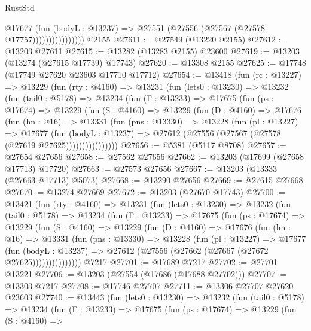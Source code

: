 \begin{lexlean}{RustStd}
\begin{coremodule}
                          @17677
                            (fun (bodyL : @13237) =>
                            @27551 (@27556 (@27567 (@27578 @17757))))))))))))))))
    @2155
@27611 := @27549 (@13220 @2155)
@27612 := @13203 @27611
@27615 := @13282 (@13283 @2155) @23600
@27619 := @13203 (@13274 (@27615 @17739) @17743)
@27620 := @13308 @2155
@27625 := @17748 (@17749 @27620 @23603 @17710 @17712)
@27654 := @13418
    (fun (rc : @13227) =>
    @13229
      (fun (rty : @4160) =>
      @13231
        (fun (lets0 : @13230) =>
        @13232
          (fun (tail0 : @5178) =>
          @13234
            (fun (Γ : @13233) =>
            @17675
              (fun (ps : @17674) =>
              @13229
                (fun (S : @4160) =>
                @13229
                  (fun (D : @4160) =>
                  @17676
                    (fun (hn : @16) =>
                    @13331
                      (fun (pns : @13330) =>
                      @13228
                        (fun (pl : @13227) =>
                        @17677
                          (fun (bodyL : @13237) =>
                          @27612 (@27556 (@27567 (@27578 (@27619 @27625))))))))))))))))
@27656 := @5381 (@5117 @8708)
@27657 := @27654 @27656
@27658 := @27562 @27656
@27662 := @13203 (@17699 (@27658 @17713) @17720)
@27663 := @27573 @27656
@27667 := @13203 (@13333 (@27663 @17713) @5073)
@27668 := @13290 @27656
@27669 := @27615 @27668
@27670 := @13274 @27669
@27672 := @13203 (@27670 @17743)
@27700 := @13421
    (fun (rty : @4160) =>
    @13231
      (fun (lets0 : @13230) =>
      @13232
        (fun (tail0 : @5178) =>
        @13234
          (fun (Γ : @13233) =>
          @17675
            (fun (ps : @17674) =>
            @13229
              (fun (S : @4160) =>
              @13229
                (fun (D : @4160) =>
                @17676
                  (fun (hn : @16) =>
                  @13331
                    (fun (pns : @13330) =>
                    @13228
                      (fun (pl : @13227) =>
                      @17677
                        (fun (bodyL : @13237) =>
                        @27612 (@27556 (@27662 (@27667 (@27672 @27625)))))))))))))))
    @7217
@27701 := @17689 @7217
@27702 := @27701 @13221
@27706 := @13203 (@27554 (@17686 (@17688 @27702)))
@27707 := @13303 @7217
@27708 := @17746 @27707
@27711 := @13306 @27707 @27620 @23603
@27740 := @13443
    (fun (lets0 : @13230) =>
    @13232
      (fun (tail0 : @5178) =>
      @13234
        (fun (Γ : @13233) =>
        @17675
          (fun (ps : @17674) =>
          @13229
            (fun (S : @4160) =>

\end{coremodule}
\end{lexlean}
